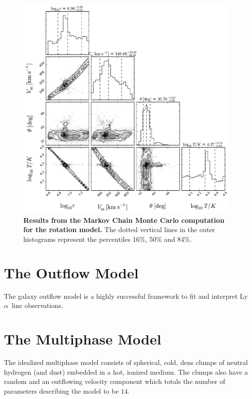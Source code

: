 \documentclass[a4paper, usenatbib, 12pt]{article}
\newcommand{\lya}{Ly$\alpha$}
\begin{document}
{\begin{figure}
\begin{center}
\includegraphics[width=1.0\textwidth]{emcee_results.pdf}
\caption{{\bf Results from the Markov Chain Monte Carlo computation for
    the rotation model.} The dotted vertical lines in the outer histograms 
	represent the percentiles 16\%, 50\% and 84\%. \label{emceeresults}} 
\end{center}
\end{figure}


\section*{The Outflow Model}
The galaxy outflow model is a highly successful framework to fit
and interpret \lya\ line observations. 



\section*{The Multiphase Model} 

The idealized multiphase model consists of spherical, cold, dens
clumps of neutral hydrogen (and dust) embedded in a hot, ionized
medium. 
The clumps also have a random and an outflowing velocity
component which totals the number of parameters describing the model
to be $14$. 

}
\end{document}
